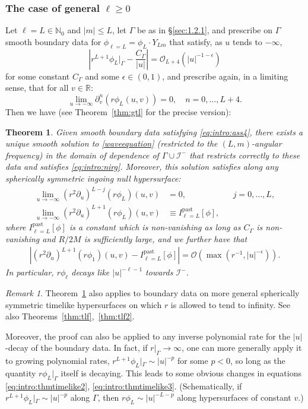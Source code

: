 \documentclass[11pt,english]{article}
\numberwithin{equation}{section}
\newtheorem{thm}{Theorem}[section]
\theoremstyle{remark}
\newtheorem{rem}{Remark}[section]
\theoremstyle{plain}
\theoremstyle{remark}
\newcommand{\pu}{\partial_u}
\newcommand{\pv}{\partial_v}
\renewcommand{\(}{\left(}
\renewcommand{\)}{\right)}
\newcommand{\ILpn}[1]{I_{\ell=#1}^{\mathrm{past}}}
\begin{document}
\subsubsection{The case of general \texorpdfstring{$\ell\geq 0$}{L>0}}
Let $\ell=L\in\mathbb N_0$ and $|m|\leq L$, let $\Gamma$ be as in \S\ref{sec:1.2.1}, and prescribe on $\Gamma$ smooth boundary data for $\phi_{\ell=L}=\phi_L \cdot Y_{Lm}$ that satisfy, as $u$ tends to $-\infty$,
\begin{equation}\label{eq:intro:ass4}
\left|r^{L+1}\phi_L|_{\Gamma}-\frac{C_\Gamma}{|u|}\right|=\mathcal{O}_{L+4}(|u|^{-1-\epsilon})
\end{equation}
for some constant $C_\Gamma$ and some $\epsilon\in(0,1)$, and prescribe again, in a limiting sense, that for all $v\in\mathbb R$: 
\begin{equation}\label{eq:intro:nirg}
\lim_{u\to-\infty}\pv^n(r\phi_L(u,v))=0,\quad n=0,\dots,L+4.
\end{equation}
Then we have (see Theorem~\ref{thm:gtl} for the precise version):
	\begin{thm}\label{thm:intro:gtl}
	Given smooth boundary data satisfying \eqref{eq:intro:ass4}, there exists a unique smooth solution to \eqref{waveequation} (restricted to the $(L,m)$-angular frequency) in the domain of dependence of $\Gamma\cup \mathcal{I}^-$ that restricts correctly to these data and satisfies \eqref{eq:intro:nirg}.
	 Moreover, this solution satisfies along any spherically symmetric ingoing null hypersurface:
	\begin{align}
	\lim_{u\to-\infty}(r^2\pu)^{L-j}(r\phi_L)(u,v)&=0,&&j=0,\dots,L,\\
	\lim_{u\to-\infty}(r^2\pu)^{L+1}(r\phi_L)(u,v)&\equiv \ILpn{L}[\phi],&&\label{eq:intro:thmtimelike2}
	\end{align}
	where $\ILpn{L}[\phi]$ is a constant which is non-vanishing as long as $C_\Gamma$ is non-vanishing and $R/2M$ is sufficiently large, and we further have that
	\begin{align}
	\left|(r^2\pu)^{L+1}(r\phi_1)(u,v) - \ILpn{L}[\phi]\right|=\mathcal{O}(\max(r^{-1},|u|^{-\epsilon})).\label{eq:intro:thmtimelike3}
	\end{align}
	In particular, $r\phi_\ell$ decays like $|u|^{-\ell-1}$ towards $\mathcal I^-$.
	\end{thm}
\begin{rem}
Theorem~\ref{thm:intro:gtl} also applies to boundary data on more general spherically symmetric timelike hypersurfaces on which $r$ is allowed to tend to infinity. See also Theorems~\ref{thm:tlf},~\ref{thm:tlf2}. 

Moreover, the proof can also be applied to any inverse polynomial rate for the $|u|$-decay of the boundary data.
In fact, if $r|_{\Gamma}\to\infty$, one can more generally apply it to growing polynomial rates, $r^{L+1}\phi_L|_{\Gamma}\sim |u|^{-p}$ for some $p<0$, so long as the quantity $r\phi_L|_{\Gamma}$ itself is decaying.
 This leads to some obvious changes in equations \eqref{eq:intro:thmtimelike2}, \eqref{eq:intro:thmtimelike3}. (Schematically, if $r^{L+1}\phi_L|_{\Gamma}\sim |u|^{-p}$ along $\Gamma$, then $r\phi_L\sim |u|^{-L-p}$ along hypersurfaces of constant $v$.)
\end{rem}
\end{document}
